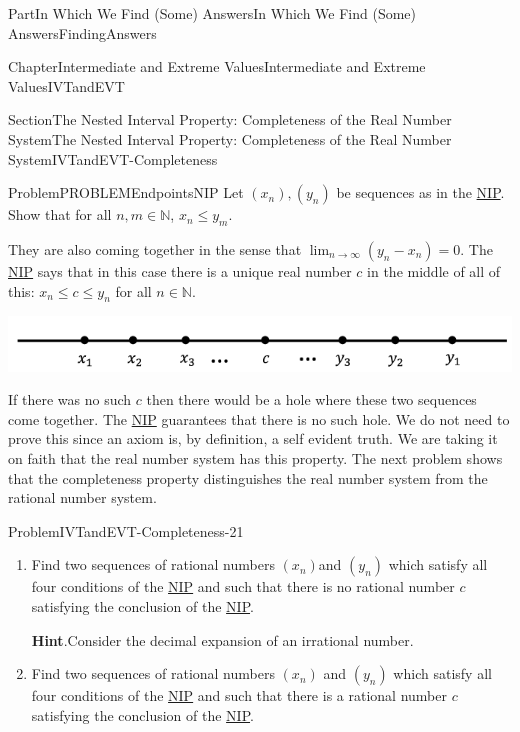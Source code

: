 \documentclass[oneside,10pt,]{book}
\newcommand{\blocktitlefont}{\relax}
\numberwithin{equation}{part}
\def\limit#1#2#3{{\displaystyle\lim_{#1\rightarrow #2}#3}}
\newcommand{\NN}{\mathbb {N}}
\begin{document}
\begin{partptx}{Part}{In Which We Find (Some) Answers}{}{In Which We Find (Some) Answers}{}{}{FindingAnswers}
\begin{chapterptx}{Chapter}{Intermediate and Extreme Values}{}{Intermediate and Extreme Values}{}{}{IVTandEVT}
\begin{sectionptx}{Section}{The Nested Interval Property: Completeness of the Real Number System}{}{The Nested Interval Property: Completeness of the Real Number System}{}{}{IVTandEVT-Completeness}
\begin{problem}{Problem}{}{PROBLEMEndpointsNIP}
Let \((x_n), (y_n)\) be sequences as in the \hyperref[NIP]{NIP}. Show that for all \(n, m \in\NN\), \(x_n\le y_m\).%
\end{problem}
They are also coming together in the sense that \(\limit{n}{\infty}{\left(y_n-x_n\right)}=0\).  The \hyperref[NIP]{NIP} says that in this case there is a unique real number \(c\) in the middle of all of this: \(x_n\leq c\leq y_n\) for all \(n\in\NN\).%
\begin{image}{0.125}{0.75}{0.125}{}%
\includegraphics[width=\linewidth]{external/images/Ch6fig4.png}
\end{image}%
If there was no such \(c\) then there would be a hole where these two sequences come together.  The \hyperref[NIP]{NIP} guarantees that there is no such hole. We do not need to prove this since an axiom is, by definition, a self evident truth.  We are taking it on faith that the real number system has this property.  The next problem shows that the completeness property distinguishes the real number system from the rational number system.%
\begin{problem}{Problem}{}{IVTandEVT-Completeness-21}%
\begin{enumerate}[font=\bfseries,label=(\alph*),ref=\alph*]%
\item{}Find two sequences of rational numbers \(\left(x_n\right)\)and \(\left(y_n\right)\) which satisfy all four conditions of the \hyperref[NIP]{NIP} and such that there is no rational number \(c\) satisfying the conclusion of the \hyperref[NIP]{NIP}.%
\par\smallskip%
\noindent\textbf{\blocktitlefont Hint}.\hypertarget{IVTandEVT-Completeness-21-2-2}{}\quad{}Consider the decimal expansion of an irrational number.%
\item{}Find two sequences of rational numbers \(\left(x_n\right)\) and \(\left(y_n\right)\) which satisfy all four conditions of the \hyperref[NIP]{NIP} and such that there is a rational number \(c\) satisfying the conclusion of the \hyperref[NIP]{NIP}.%
\end{enumerate}%
\end{problem}

\end{sectionptx}
\end{chapterptx}
\end{partptx}
\end{document}
